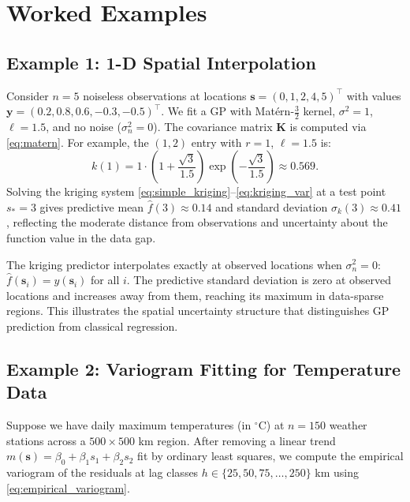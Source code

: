 \documentclass[conference]{IEEEtran}
\begin{document}
\section{Worked Examples}
\label{sec:examples}

\subsection{Example 1: 1-D Spatial Interpolation}

Consider $n = 5$ noiseless observations at locations $\mathbf{s} = (0, 1, 2, 4, 5)^\top$ with values $\mathbf{y} = (0.2, 0.8, 0.6, -0.3, -0.5)^\top$. We fit a GP with Mat\'{e}rn-$\tfrac{3}{2}$ kernel, $\sigma^2 = 1$, $\ell = 1.5$, and no noise ($\sigma_n^2 = 0$). The covariance matrix $\mathbf{K}$ is computed via \eqref{eq:matern}. For example, the $(1,2)$ entry with $r = 1$, $\ell = 1.5$ is:
\begin{equation}
  k(1) = 1\cdot\!\left(1 + \frac{\sqrt{3}}{1.5}\right)\exp\!\left(-\frac{\sqrt{3}}{1.5}\right) \approx 0.569.
\end{equation}
Solving the kriging system \eqref{eq:simple_kriging}--\eqref{eq:kriging_var} at a test point $s_* = 3$ gives predictive mean $\hat{f}(3) \approx 0.14$ and standard deviation $\sigma_k(3) \approx 0.41$, reflecting the moderate distance from observations and uncertainty about the function value in the data gap.

The kriging predictor interpolates exactly at observed locations when $\sigma_n^2 = 0$: $\hat{f}(\mathbf{s}_i) = y(\mathbf{s}_i)$ for all $i$. The predictive standard deviation is zero at observed locations and increases away from them, reaching its maximum in data-sparse regions. This illustrates the spatial uncertainty structure that distinguishes GP prediction from classical regression.

\subsection{Example 2: Variogram Fitting for Temperature Data}

Suppose we have daily maximum temperatures (in $^\circ$C) at $n = 150$ weather stations across a $500 \times 500$ km region. After removing a linear trend $m(\mathbf{s}) = \beta_0 + \beta_1 s_1 + \beta_2 s_2$ fit by ordinary least squares, we compute the empirical variogram of the residuals at lag classes $h \in \{25, 50, 75, \ldots, 250\}$ km using \eqref{eq:empirical_variogram}.
\end{document}
